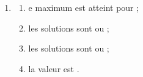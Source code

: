 \documentclass[a4paper,11pt]{article}
\begin{document}
\begin{enumerate}
\begin{center}
	\end{center}
	\item 
	\begin{enumerate}
		\item e maximum est  atteint pour  ;
		\item les solutions sont  ou  ;
		\item les solutions sont  ou  ;
		\item la valeur est .
	\end{enumerate}
\end{enumerate}
%
%
\end{document}
